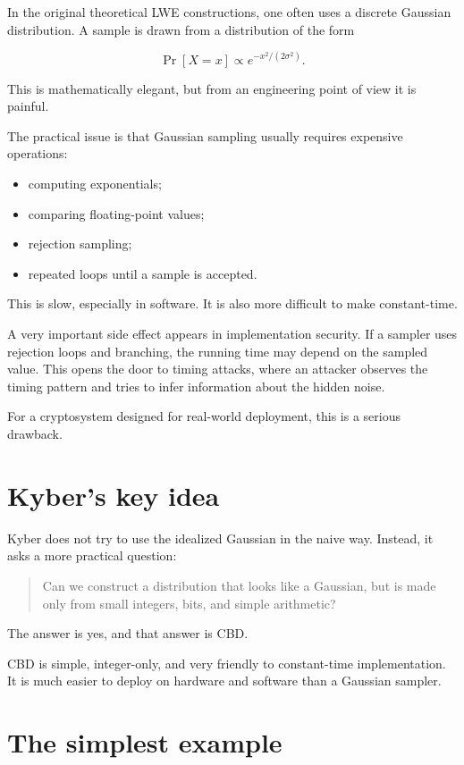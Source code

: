 In the original theoretical LWE constructions, one often uses a discrete Gaussian distribution. A sample is drawn from a distribution of the form

\[
\Pr[X=x] \propto e^{-x^2/(2\sigma^2)}.
\]

This is mathematically elegant, but from an engineering point of view it is painful.

The practical issue is that Gaussian sampling usually requires expensive operations:

\begin{itemize}
  \item computing exponentials;
  \item comparing floating-point values;
  \item rejection sampling;
  \item repeated loops until a sample is accepted.
\end{itemize}

This is slow, especially in software. It is also more difficult to make constant-time.

A very important side effect appears in implementation security. If a sampler uses rejection loops and branching, the running time may depend on the sampled value. This opens the door to timing attacks, where an attacker observes the timing pattern and tries to infer information about the hidden noise.

For a cryptosystem designed for real-world deployment, this is a serious drawback.

\section{Kyber's key idea}

Kyber does not try to use the idealized Gaussian in the naive way.
Instead, it asks a more practical question:

\begin{quote}
Can we construct a distribution that looks like a Gaussian, but is made only from small integers, bits, and simple arithmetic?
\end{quote}

The answer is yes, and that answer is CBD.

CBD is simple, integer-only, and very friendly to constant-time implementation. It is much easier to deploy on hardware and software than a Gaussian sampler.

\section{The simplest example}


